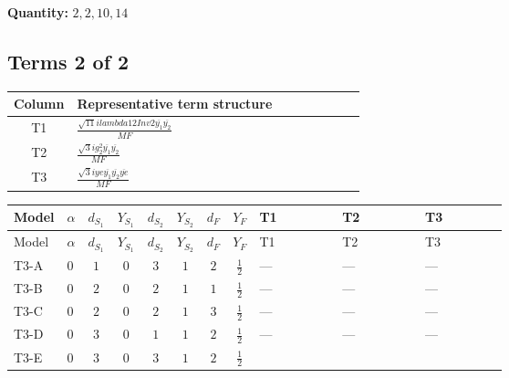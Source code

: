 \documentclass[8pt]{article}
\begin{document}
\begin{landscape}
\begin{longtable}{@{}llcccccc >{\raggedright\arraybackslash}p{0.21\linewidth} >{\raggedright\arraybackslash}p{0.21\linewidth} >{\raggedright\arraybackslash}p{0.21\linewidth}@{}}
\midrule
\bottomrule
\end{longtable}
\clearpage
\noindent\textbf{Quantity: }$\mathrm{2,2,10,14}$\par\smallskip
\subsection*{Terms 2 of 2}
\begin{center}
\begin{tabular}{@{}c >{\raggedright\arraybackslash}p{0.82\linewidth}@{}}
\toprule
Column & Representative term structure \\
\midrule
T1 & \(\displaystyle \frac{\sqrt{11} i lambda12Inv2 \overline{y_{1}} \overline{y_{2}}}{MF}\) \\
\midrule
T2 & \(\displaystyle \frac{\sqrt{3} i g_{2}^{2} \overline{y_{1}} \overline{y_{2}}}{MF}\) \\
\midrule
T3 & \(\displaystyle \frac{\sqrt{3} i ye \overline{y_{1}} \overline{y_{2}} \overline{ye}}{MF}\) \\
\midrule
\bottomrule
\end{tabular}
\end{center}
\smallskip
\tiny
\begin{longtable}{@{}llcccccc >{\raggedright\arraybackslash}p{0.21\linewidth} >{\raggedright\arraybackslash}p{0.21\linewidth} >{\raggedright\arraybackslash}p{0.21\linewidth}@{}}
\toprule
Model & $\alpha$ & $d_{S_1}$ & $Y_{S_1}$ & $d_{S_2}$ & $Y_{S_2}$ & $d_F$ & $Y_F$ & T1 & T2 & T3 \\
\midrule
\endfirsthead
\toprule
Model & $\alpha$ & $d_{S_1}$ & $Y_{S_1}$ & $d_{S_2}$ & $Y_{S_2}$ & $d_F$ & $Y_F$ & T1 & T2 & T3 \\
\midrule
\endhead
T3-A & $0$ & $1$ & $0$ & $3$ & $1$ & $2$ & $\frac{1}{2}$ & --- & --- & --- \\
\midrule
T3-B & $0$ & $2$ & $0$ & $2$ & $1$ & $1$ & $\frac{1}{2}$ & --- & --- & --- \\
\midrule
T3-C & $0$ & $2$ & $0$ & $2$ & $1$ & $3$ & $\frac{1}{2}$ & --- & --- & --- \\
\midrule
T3-D & $0$ & $3$ & $0$ & $1$ & $1$ & $2$ & $\frac{1}{2}$ & --- & --- & --- \\
\midrule
T3-E & $0$ & $3$ & $0$ & $3$ & $1$ & $2$ & $\frac{1}{2}$ & \scriptsize\adjustbox{max width=\linewidth}{$\begin{gathered} \frac{3 \sqrt{11} i lambda12Inv2 \overline{y_{1}} \overline{y_{2}}}{22 MF}\end{gathered}$} & \scriptsize\adjustbox{max width=\linewidth}{$\begin{gathered} \frac{11 \sqrt{3} i g_{2}^{2} \overline{y_{1}} \overline{y_{2}}}{8 MF}\end{gathered}$} & \scriptsize\adjustbox{max width=\linewidth}{$\begin{gathered} - \frac{\sqrt{3} i ye \overline{y_{1}} \overline{y_{2}} \overline{ye}}{12 MF}\end{gathered}$} \\

\end{longtable}
\end{landscape}
\end{document}
